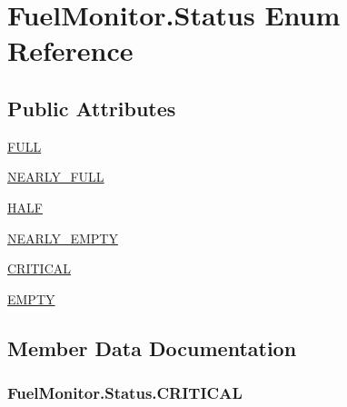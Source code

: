 \hypertarget{enum_fuel_monitor_1_1_status}{}\section{Fuel\+Monitor.\+Status Enum Reference}
\label{enum_fuel_monitor_1_1_status}
\subsection*{Public Attributes}
\begin{DoxyCompactItemize}
\item 
\hyperlink{enum_fuel_monitor_1_1_status_aac352dcb5d9ecb69f41f01e56fb82d55}{F\+U\+L\+L}
\item 
\hyperlink{enum_fuel_monitor_1_1_status_af2c6e63cd53ffba5b4b920c59aa8529b}{N\+E\+A\+R\+L\+Y\+\_\+\+F\+U\+L\+L}
\item 
\hyperlink{enum_fuel_monitor_1_1_status_ac5010cffc823969514006118522e7523}{H\+A\+L\+F}
\item 
\hyperlink{enum_fuel_monitor_1_1_status_ac7ee466e69fa982a98b9001959ad1524}{N\+E\+A\+R\+L\+Y\+\_\+\+E\+M\+P\+T\+Y}
\item 
\hyperlink{enum_fuel_monitor_1_1_status_a79986d761f5bfd7c3bdd83d31e1549aa}{C\+R\+I\+T\+I\+C\+A\+L}
\item 
\hyperlink{enum_fuel_monitor_1_1_status_a6e7f29a533b83c823250c0c78878a780}{E\+M\+P\+T\+Y}
\end{DoxyCompactItemize}


\subsection{Member Data Documentation}
\hypertarget{enum_fuel_monitor_1_1_status_a79986d761f5bfd7c3bdd83d31e1549aa}{}
\subsubsection[{C\+R\+I\+T\+I\+C\+A\+L}]{\setlength{\rightskip}{0pt plus 5cm}Fuel\+Monitor.\+Status.\+C\+R\+I\+T\+I\+C\+A\+L}\label{enum_fuel_monitor_1_1_status_a79986d761f5bfd7c3bdd83d31e1549aa}
\hypertarget{enum_fuel_monitor_1_1_status_a6e7f29a533b83c823250c0c78878a780}{}
